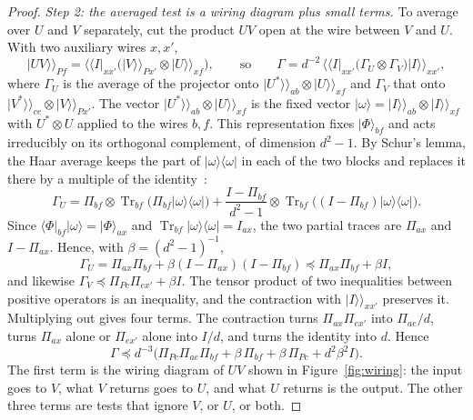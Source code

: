 \documentclass[11pt,letterpaper]{article}
\theoremstyle{definition}\newtheorem{definition}[theorem]{Definition}
\newcommand{\Tr}{\operatorname{Tr}}
\newcommand{\ket}[1]{\lvert#1\rangle}
\newcommand{\bra}[1]{\langle#1\rvert}
\newcommand{\proj}[1]{\ket{#1}\!\bra{#1}}
\newcommand{\vket}[1]{\lvert#1\rangle\!\rangle}
\newcommand{\vbra}[1]{\langle\!\langle#1\rvert}
\newcommand{\reffig}[1]{Figure~\ref{#1}}
\begin{document}
\begin{proof}
\emph{Step 2: the averaged test is a wiring diagram plus small terms.}
To average over $U$ and $V$ separately, cut the product $UV$ open at
the wire between $V$ and $U$. With two auxiliary wires $x,x'$,
\[
 \vket{UV}_{Pf}=\vbra I_{xx'}\bigl(\vket V_{Px'}\otimes\vket U_{xf}\bigr),
 \qquad\text{so}\qquad
 \Gamma=d^{-2}\,\vbra I_{xx'}\bigl(\Gamma_U\otimes\Gamma_V\bigr)\vket I_{xx'},
\]
where $\Gamma_U$ is the average of the projector onto
$\vket{U^*}_{ab}\otimes\vket U_{xf}$ and $\Gamma_V$ that onto
$\vket{V^*}_{ce}\otimes\vket V_{Px'}$. The vector
$\vket{U^*}_{ab}\otimes\vket U_{xf}$ is the fixed vector
$\ket\omega=\vket I_{ab}\otimes\vket I_{xf}$ with $U^*\otimes U$ applied
to the wires $b,f$. This representation fixes $\ket\Phi_{bf}$ and acts
irreducibly on its orthogonal complement, of dimension $d^2-1$. By
Schur's lemma, the Haar average keeps the part of $\proj\omega$ in each
of the two blocks and replaces it there by a multiple of the
identity~\cite{collins2006}:
\[
 \Gamma_U=\Pi_{bf}\otimes\Tr_{bf}\bigl(\Pi_{bf}\proj\omega\bigr)
 +\frac{I-\Pi_{bf}}{d^2-1}\otimes\Tr_{bf}\bigl((I-\Pi_{bf})\proj\omega\bigr).
\]
Since $\bra\Phi_{bf}\ket\omega=\ket\Phi_{ax}$ and
$\Tr_{bf}\proj\omega=I_{ax}$, the two partial traces are $\Pi_{ax}$ and
$I-\Pi_{ax}$. Hence, with $\beta=(d^2-1)^{-1}$,
\begin{equation}\label{eq:frame}
 \Gamma_U=\Pi_{ax}\Pi_{bf}+\beta(I-\Pi_{ax})(I-\Pi_{bf})
 \preceq\Pi_{ax}\Pi_{bf}+\beta I,
\end{equation}
and likewise $\Gamma_V\preceq\Pi_{Pc}\Pi_{ex'}+\beta I$. The tensor
product of two inequalities between positive operators is an
inequality, and the contraction with $\vket I_{xx'}$ preserves it.
Multiplying out gives four terms. The contraction turns
$\Pi_{ax}\Pi_{ex'}$ into $\Pi_{ae}/d$, turns $\Pi_{ax}$ alone or
$\Pi_{ex'}$ alone into $I/d$, and turns the identity into $d$. Hence
\begin{equation}\label{eq:envelope}
 \Gamma\preceq d^{-3}\bigl(\Pi_{Pc}\Pi_{ae}\Pi_{bf}
 +\beta\,\Pi_{bf}+\beta\,\Pi_{Pc}+d^2\beta^2 I\bigr).
\end{equation}
The first term is the wiring diagram of $UV$ shown in
\reffig{fig:wiring}: the input goes to $V$, what $V$ returns goes to
$U$, and what $U$ returns is the output. The
other three terms are tests that ignore $V$, or $U$, or both.


\end{proof}
\end{document}
